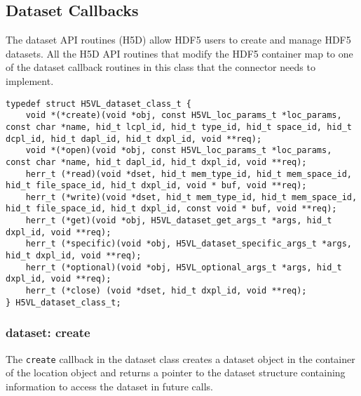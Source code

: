 
\subsection{Dataset Callbacks}
The dataset API routines (H5D) allow HDF5 users to create and manage
HDF5 datasets. All the H5D API routines that modify the HDF5 container
map to one of the dataset callback routines in this class that the
connector needs to implement.

\begin{lstlisting}[caption={Structure for dataset callback routines, H5VLconnector.h}, captionpos=b, label={lst:DSclass}]
typedef struct H5VL_dataset_class_t {                                            
    void *(*create)(void *obj, const H5VL_loc_params_t *loc_params, const char *name, hid_t lcpl_id, hid_t type_id, hid_t space_id, hid_t dcpl_id, hid_t dapl_id, hid_t dxpl_id, void **req);
    void *(*open)(void *obj, const H5VL_loc_params_t *loc_params, const char *name, hid_t dapl_id, hid_t dxpl_id, void **req);
    herr_t (*read)(void *dset, hid_t mem_type_id, hid_t mem_space_id, hid_t file_space_id, hid_t dxpl_id, void * buf, void **req);
    herr_t (*write)(void *dset, hid_t mem_type_id, hid_t mem_space_id, hid_t file_space_id, hid_t dxpl_id, const void * buf, void **req);
    herr_t (*get)(void *obj, H5VL_dataset_get_args_t *args, hid_t dxpl_id, void **req);
    herr_t (*specific)(void *obj, H5VL_dataset_specific_args_t *args, hid_t dxpl_id, void **req);
    herr_t (*optional)(void *obj, H5VL_optional_args_t *args, hid_t dxpl_id, void **req);
    herr_t (*close) (void *dset, hid_t dxpl_id, void **req);
} H5VL_dataset_class_t; 
\end{lstlisting}

\subsubsection{dataset: create}
The \texttt{create} callback in the dataset class creates a dataset
object in the container of the location object and returns a pointer
to the dataset structure containing information to access the dataset
in future calls.\bigskip

